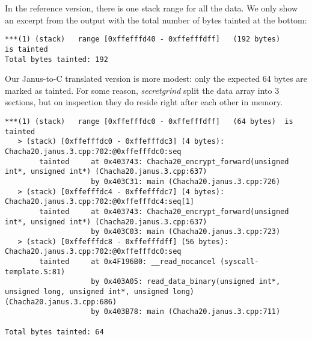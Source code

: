 \documentclass[a4paper,10pt,openright]{memoir}
\newcommand{\term}[1]{\textit{#1}}
\begin{document}

In the reference version, there is one stack range for all the data. We 
only show an excerpt from the output with the total number of bytes 
tainted at the bottom:

\begin{verbatim}
***(1) (stack)	 range [0xffefffd40 - 0xffefffdff]	 (192 bytes)	 is tainted
Total bytes tainted: 192
\end{verbatim}

Our Janus-to-C translated version is more modest: only the expected 64 
bytes are marked as tainted. For some reason, \term{secretgrind} split 
the data array into 3 sections, but on inspection they do reside right 
after each other in memory.

\begin{verbatim}
***(1) (stack)	 range [0xffefffdc0 - 0xffefffdff]	 (64 bytes)	 is tainted
   > (stack) [0xffefffdc0 - 0xffefffdc3] (4 bytes): Chacha20.janus.3.cpp:702:@0xffefffdc0:seq
        tainted     at 0x403743: Chacha20_encrypt_forward(unsigned int*, unsigned int*) (Chacha20.janus.3.cpp:637)
                    by 0x403C31: main (Chacha20.janus.3.cpp:726)
   > (stack) [0xffefffdc4 - 0xffefffdc7] (4 bytes): Chacha20.janus.3.cpp:702:@0xffefffdc4:seq[1]
        tainted     at 0x403743: Chacha20_encrypt_forward(unsigned int*, unsigned int*) (Chacha20.janus.3.cpp:637)
                    by 0x403C03: main (Chacha20.janus.3.cpp:723)
   > (stack) [0xffefffdc8 - 0xffefffdff] (56 bytes): Chacha20.janus.3.cpp:702:@0xffefffdc0:seq
        tainted     at 0x4F196B0: __read_nocancel (syscall-template.S:81)
                    by 0x403A05: read_data_binary(unsigned int*, unsigned long, unsigned int*, unsigned long) (Chacha20.janus.3.cpp:686)
                    by 0x403B78: main (Chacha20.janus.3.cpp:711)

Total bytes tainted: 64
\end{verbatim}
\end{document}
